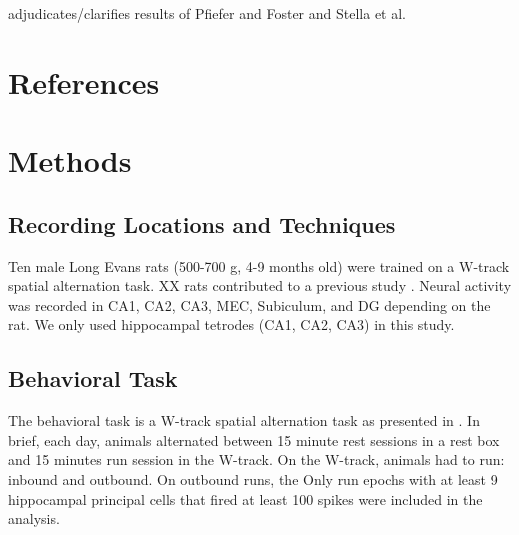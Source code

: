 \documentclass[times, twoside]{zHenriquesLab-StyleBioRxiv}
\begin{document}
adjudicates/clarifies results of Pfiefer and Foster and Stella et al.


\begin{acknowledgements}
\end{acknowledgements}

\section*{References}


\onecolumn
\newpage

\section*{Methods}
\subsection*{Recording Locations and Techniques}
Ten male Long Evans rats (500-700 g, 4-9 months old) were trained on a W-track spatial alternation task. XX rats contributed to a previous study \cite{KarlssonAwakereplayremote2009}. Neural activity was recorded in CA1, CA2, CA3, MEC, Subiculum, and DG depending on the rat. We only used hippocampal tetrodes (CA1, CA2, CA3) in this study.

\subsection*{Behavioral Task}
The behavioral task is a W-track spatial alternation task as presented in \cite{KarlssonAwakereplayremote2009}. In brief, each day, animals alternated between 15 minute rest sessions in a rest box and 15 minutes run session in the W-track. On the W-track, animals had to run: inbound and outbound. On outbound runs, the Only run epochs with at least 9 hippocampal principal cells that fired at least 100 spikes were included in the analysis.
\end{document}
